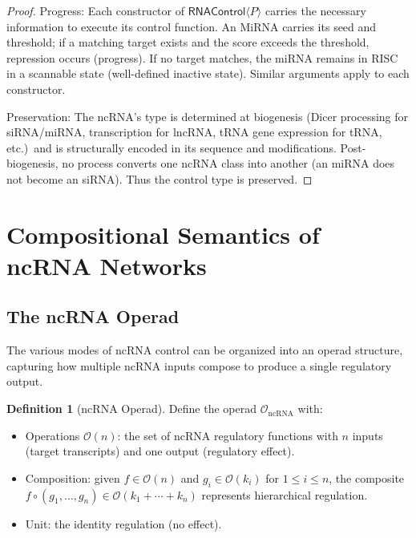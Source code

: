 \documentclass[12pt,a4paper]{article}
\theoremstyle{definition}
\newtheorem{definition}[theorem]{Definition}
\newcommand{\RNAType}{\mathsf{RNAControl}}
\begin{document}
\begin{proof}
Progress: Each constructor of $\RNAType\langle P\rangle$ carries the
necessary information to execute its control function.  An MiRNA
carries its seed and threshold; if a matching target exists and the
score exceeds the threshold, repression occurs (progress).  If no
target matches, the miRNA remains in RISC in a scannable state
(well-defined inactive state).  Similar arguments apply to each
constructor.

Preservation: The ncRNA's type is determined at biogenesis (Dicer
processing for siRNA/miRNA, transcription for lncRNA, tRNA gene
expression for tRNA, etc.)\ and is structurally encoded in its
sequence and modifications.  Post-biogenesis, no process converts
one ncRNA class into another (an miRNA does not become an siRNA).
Thus the control type is preserved.
\end{proof}

\section{Compositional Semantics of ncRNA Networks}\label{sec:composition}

\subsection{The ncRNA Operad}

The various modes of ncRNA control can be organized into an operad
structure, capturing how multiple ncRNA inputs compose to produce
a single regulatory output.

\begin{definition}[ncRNA Operad]
Define the operad $\mathcal{O}_{\text{ncRNA}}$ with:
\begin{itemize}
  \item Operations $\mathcal{O}(n)$: the set of ncRNA regulatory
    functions with $n$ inputs (target transcripts) and one output
    (regulatory effect).
  \item Composition: given $f \in \mathcal{O}(n)$ and
    $g_i \in \mathcal{O}(k_i)$ for $1 \leq i \leq n$, the composite
    $f \circ (g_1, \ldots, g_n) \in \mathcal{O}(k_1 + \cdots + k_n)$
    represents hierarchical regulation.
  \item Unit: the identity regulation (no effect).
\end{itemize}
\end{definition}
\end{document}
